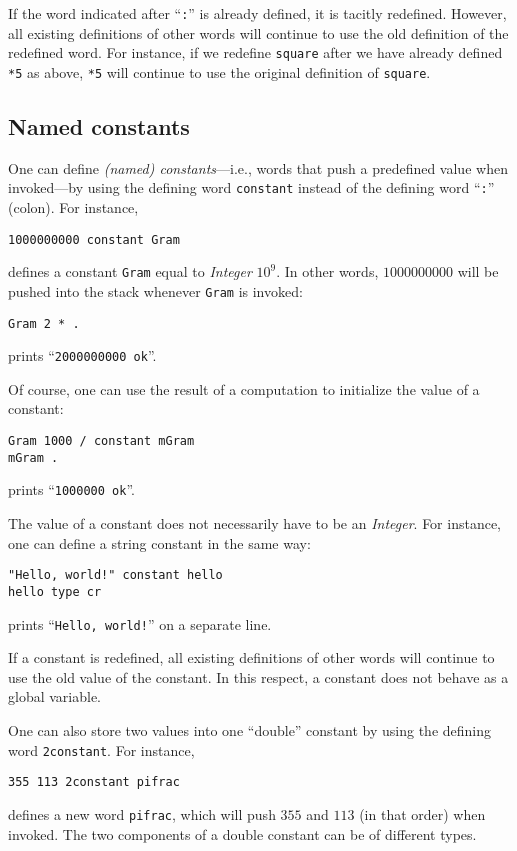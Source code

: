 \documentclass[12pt,oneside]{article}
\def\mysubsection#1{\subsection{#1}\fancyhead[C]{\small{\textsc{\textrm{\thesubsection.} #1}}}}
\begin{document}
If the word indicated after ``{\tt :}'' is already defined, it is tacitly redefined. However, all existing definitions of other words will continue to use the old definition of the redefined word. For instance, if we redefine {\tt square} after we have already defined {\tt **5} as above, {\tt **5} will continue to use the original definition of {\tt square}.

\mysubsection{Named constants}\label{p:constants}
One can define {\em (named) constants}---i.e., words that push a predefined value when invoked---by using the defining word {\tt constant} instead of the defining word ``{\tt :}'' (colon). For instance,
\begin{verbatim}
1000000000 constant Gram
\end{verbatim}
defines a constant {\tt Gram} equal to {\em Integer\/} $10^9$. In other words, $1000000000$ will be pushed into the stack whenever {\tt Gram} is invoked:
\begin{verbatim}
Gram 2 * .
\end{verbatim}
prints ``{\tt 2000000000 ok}''.

Of course, one can use the result of a computation to initialize the value of a constant:
\begin{verbatim}
Gram 1000 / constant mGram
mGram .
\end{verbatim}
prints ``{\tt 1000000 ok}''.

The value of a constant does not necessarily have to be an {\em Integer}. For instance, one can define a string constant in the same way:
\begin{verbatim}
"Hello, world!" constant hello
hello type cr
\end{verbatim}
prints ``{\tt Hello, world!}'' on a separate line.

If a constant is redefined, all existing definitions of other words will continue to use the old value of the constant. In this respect, a constant does not behave as a global variable.

One can also store two values into one ``double'' constant by using the defining word {\tt 2constant}. For instance,
\begin{verbatim}
355 113 2constant pifrac
\end{verbatim}
defines a new word {\tt pifrac}, which will push $355$ and $113$ (in that order) when invoked. The two components of a double constant can be of different types.
\end{document}
